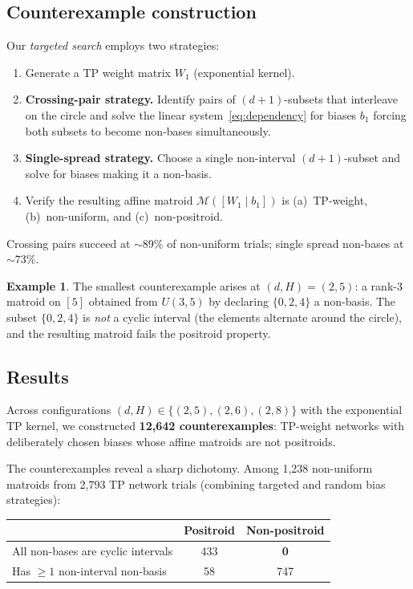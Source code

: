 \documentclass[11pt]{article}
\theoremstyle{definition}
\newtheorem{example}[theorem]{Example}
\theoremstyle{remark}
\newcommand{\cM}{\mathcal{M}}
\begin{document}
\subsection{Counterexample construction}\label{sec:construction}

Our \emph{targeted search} employs two strategies:
\begin{enumerate}
  \item Generate a TP weight matrix $W_1$ (exponential kernel).
  \item \textbf{Crossing-pair strategy.}  Identify pairs of
    $(d{+}1)$-subsets that interleave on the circle and solve
    the linear system~\eqref{eq:dependency} for biases $b_1$
    forcing both subsets to become non-bases simultaneously.
  \item \textbf{Single-spread strategy.}  Choose a single
    non-interval $(d{+}1)$-subset and solve for biases making it
    a non-basis.
  \item Verify the resulting affine matroid $\cM([W_1 \mid b_1])$ is
    (a)~TP-weight, (b)~non-uniform, and (c)~non-positroid.
\end{enumerate}
Crossing pairs succeed at ${\sim}89\%$ of non-uniform trials;
single spread non-bases at ${\sim}73\%$.

\begin{example}\label{ex:smallest}
  The smallest counterexample arises at $(d, H) = (2, 5)$: a
  rank-3 matroid on $[5]$ obtained from $U(3, 5)$ by declaring
  $\{0, 2, 4\}$ a non-basis.  The subset $\{0, 2, 4\}$ is \emph{not}
  a cyclic interval (the elements alternate around the circle),
  and the resulting matroid fails the positroid property.
\end{example}

\subsection{Results}\label{sec:counterexample-results}

Across configurations $(d, H) \in \{(2,5), (2,6), (2,8)\}$
with the exponential TP kernel, we constructed
\textbf{12,642 counterexamples}: TP-weight networks with
deliberately chosen biases whose affine matroids are not positroids.

The counterexamples reveal a sharp dichotomy.  Among 1{,}238
non-uniform matroids from 2{,}793 TP network trials (combining
targeted and random bias strategies):

\begin{center}
\begin{tabular}{lcc}
  \toprule
  & \textbf{Positroid} & \textbf{Non-positroid} \\
  \midrule
  All non-bases are cyclic intervals & 433 & \textbf{0} \\
  Has $\geq 1$ non-interval non-basis & 58 & 747 \\
  \bottomrule
\end{tabular}
\end{center}
\end{document}
